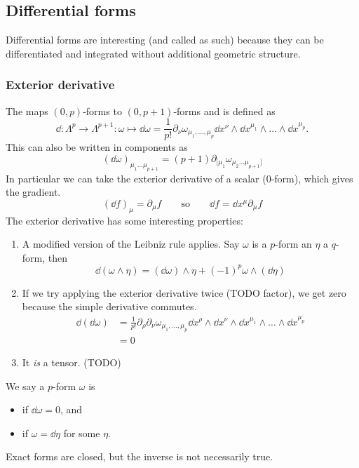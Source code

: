\subsection{Differential forms}
Differential forms are interesting (and called as such) because they can be differentiated and integrated without additional geometric structure.

\subsubsection{Exterior derivative}
The  maps $(0,p)$-forms to $(0,p+1)$-forms and is defined as
\[ \dd{}: \Lambda^p \to \Lambda^{p+1}: \omega \mapsto \dd{\omega} = \frac{1}{p!}\partial_\nu\omega_{\mu_1,\ldots,\mu_p} \dd{x^\nu}\wedge \dd{x^{\mu_1}}\wedge \ldots \wedge \dd{x^{\mu_p}}. \]
This can also be written in components as
\[ (\dd{\omega})_{\mu_1\ldots\mu_{p+1}} = (p+1)\partial_{[\mu_1}\omega_{\mu_2\ldots\mu_{p+1}]} \]
In particular we can take the exterior derivative of a scalar ($0$-form), which gives the gradient.
\[ (\dd{f})_\mu = \partial_\mu f \qquad \text{so} \qquad \dd{f} = \dd{x^\mu}\partial_\mu f \]
The exterior derivative has some interesting properties:
\begin{enumerate}
\item A modified version of the Leibniz rule applies. Say $\omega$ is a $p$-form an $\eta$ a $q$-form, then
\[ \dd{(\omega \wedge \eta)} = (\dd{\omega})\wedge \eta + (-1)^p\omega\wedge (\dd{\eta}) \] 
\item If we try applying the exterior derivative twice (TODO factor), we get zero because the simple derivative commutes.
\begin{align*}
\dd{(\dd{\omega})} &= \frac{1}{p!}\partial_\rho\partial_\nu\omega_{\mu_1,\ldots,\mu_p} \dd{x^\rho}\wedge\dd{x^\nu}\wedge \dd{x^{\mu_1}}\wedge \ldots \wedge \dd{x^{\mu_p}} \\
&= 0
\end{align*}
\item It \textit{is} a tensor. (TODO)
\end{enumerate}
We say a $p$-form $\omega$ is
\begin{itemize}
\item {} if $\dd{\omega} = 0$, and
\item {} if $\omega = \dd{\eta}$ for some $\eta$.
\end{itemize}
Exact forms are closed, but the inverse is not necessarily true.


